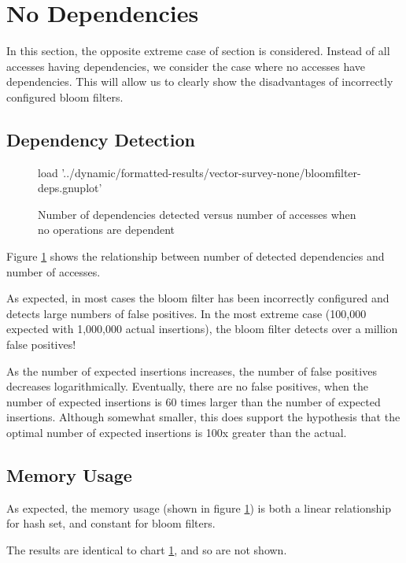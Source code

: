 \section{No Dependencies} \label{sec:results/none}
	In this section, the opposite extreme case of section \label{sec:results/all} is considered. Instead of all accesses having dependencies, we consider the case where no accesses have dependencies. This will allow us to clearly show the disadvantages of incorrectly configured bloom filters.

	\subsection{Dependency Detection} \label{sec:results/none/deps}
	\begin{figure}
		\centering
		\begin{gnuplot}[terminal=pdf]
		load '../dynamic/formatted-results/vector-survey-none/bloomfilter-deps.gnuplot'
		\end{gnuplot}
		\caption{Number of dependencies detected versus number of accesses when no operations are dependent}
		\label{chart:none-dep}
	\end{figure}
	
	Figure \ref{chart:none-dep} shows the relationship between number of detected dependencies and number of accesses.
	
	As expected, in most cases the bloom filter has been incorrectly configured and detects large numbers of false positives. In the most extreme case (100,000 expected with 1,000,000 actual insertions), the bloom filter detects over a million false positives!
	
	As the number of expected insertions increases, the number of false positives decreases logarithmically. Eventually, there are no false positives, when the number of expected insertions is 60 times larger than the number of expected insertions. Although somewhat smaller, this does support the hypothesis that the optimal number of expected insertions is 100x greater than the actual.
	
	\subsection{Memory Usage} \label{sec:results/none/mem}
	As expected, the memory usage (shown in figure \ref{chart:none-dep}) is both a linear relationship for hash set, and constant for bloom filters.
	
	The results are identical to chart \ref{chart:none-dep}, and so are not shown.
	
